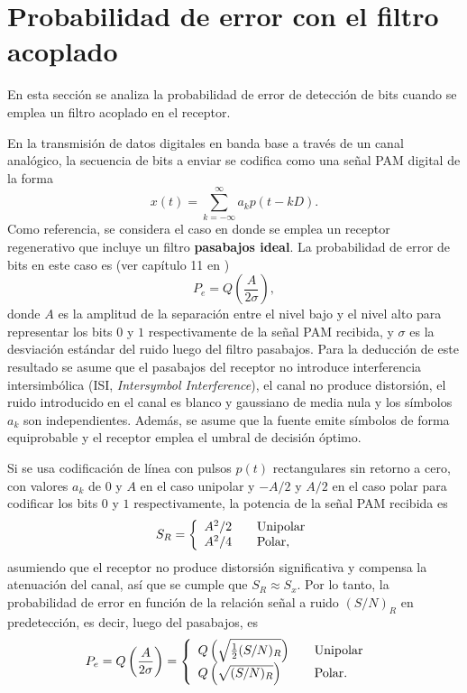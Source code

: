 \documentclass[a4paper]{article}
\begin{document}
\section{Probabilidad de error con el filtro acoplado}

En esta sección se analiza la probabilidad de error de detección de bits cuando se emplea un filtro acoplado en el receptor. 

En la transmisión de datos digitales en banda base a través de un canal analógico, la secuencia de bits a enviar se codifica como una señal PAM digital de la forma
\begin{equation}\label{eq:digital_pam_waveform}
 x(t)=\sum_{k=-\infty}^{\infty}a_kp(t-kD).
\end{equation}
Como referencia, se considera el caso en donde se emplea un receptor regenerativo que incluye un filtro \textbf{pasabajos ideal}. La probabilidad de error de bits en este caso es (ver capítulo 11 en \cite{Carlson2009})
\begin{equation}\label{eq:generic_error_probability}
 P_e=Q\left(\frac{A}{2\sigma}\right),
\end{equation}
donde \(A\) es la amplitud de la separación entre el nivel bajo y el nivel alto para representar los bits \(0\) y \(1\) respectivamente de la señal PAM recibida, y \(\sigma\) es la desviación estándar del ruido luego del filtro pasabajos. Para la deducción de este resultado se asume que el pasabajos del receptor no introduce interferencia intersimbólica (ISI, \emph{Intersymbol Interference}), el canal no produce distorsión, el ruido introducido en el canal es blanco y gaussiano de media nula y los símbolos \(a_k\) son independientes. Además, se asume que la fuente emite símbolos de forma equiprobable y el receptor emplea el umbral de decisión óptimo.

Si se usa codificación de línea con pulsos \(p(t)\) rectangulares sin retorno a cero, con valores \(a_k\) de \(0\) y \(A\) en el caso unipolar y \(-A/2\) y \(A/2\) en el caso polar para codificar los bits \(0\) y \(1\) respectivamente, la potencia de la señal PAM recibida es
\begin{equation}\label{eq:sr_rectangular_pam}
 S_R=\left\{ 
    \begin{array}{l l l}
    A^2/2 & & \textrm{Unipolar}\\
    A^2/4 & & \textrm{Polar,} \end{array} \right.
\end{equation}
asumiendo que el receptor no produce distorsión significativa y compensa la atenuación del canal, así que se cumple que \(S_R\approx S_x\). Por lo tanto, la probabilidad de error en función de la relación señal a ruido \((S/N)_R\) en predetección, es decir, luego del pasabajos, es
\begin{align*}
  P_e&=Q\left(\frac{A}{2\sigma}\right)
    =\left\{ 
      \begin{array}{l l l}
    Q\left(\sqrt{\frac{1}{2}(S/N)_R}\right) & & \textrm{Unipolar}\\
    Q\left(\sqrt{(S/N)_R}\right) & & \textrm{Polar.} \end{array} \right.
\end{align*}
\end{document}

